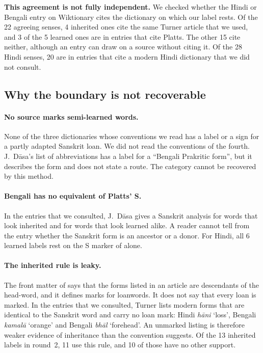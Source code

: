 \documentclass[11pt]{article}
\newcommand{\gl}[1]{`#1'}
\begin{document}
\textbf{This agreement is not fully independent.} We checked whether the Hindi or Bengali entry on Wiktionary cites the dictionary on which our label rests. Of the 22 agreeing senses, 4 inherited ones cite the same Turner article that we used, and 3 of the 5 learned ones are in entries that cite Platts. The other 15 cite neither, although an entry can draw on a source without citing it. Of the 28 Hindi senses, 20 are in entries that cite a modern Hindi dictionary that we did not consult.

\subsection{Why the boundary is not recoverable}

\paragraph{No source marks semi-learned words.} None of the three dictionaries whose conventions we read has a label or a sign for a partly adapted Sanskrit loan. We did not read the conventions of the fourth. J.~D\=asa's list of abbreviations has a label for a ``Bengali Prakritic form'', but it describes the form and does not state a route. The category cannot be recovered by this method.

\paragraph{Bengali has no equivalent of Platts' S.} In the entries that we consulted, J.~D\=asa gives a Sanskrit analysis for words that look inherited and for words that look learned alike. A reader cannot tell from the entry whether the Sanskrit form is an ancestor or a donor. For Hindi, all 6 learned labels rest on the S marker of \citet{platts1884} alone.

\paragraph{The inherited rule is leaky.} The front matter of \citet{turner1966cdial} says that the forms listed in an article are descendants of the head-word, and it defines marks for loanwords. It does not say that every loan is marked. In the entries that we consulted, Turner lists modern forms that are identical to the Sanskrit word and carry no loan mark: Hindi \textit{h\=ani} \gl{loss}, Bengali \textit{kamal\=a} \gl{orange} and Bengali \textit{bh\=al} \gl{forehead}. An unmarked listing is therefore weaker evidence of inheritance than the convention suggests. Of the 13 inherited labels in round~2, 11 use this rule, and 10 of those have no other support.
\end{document}
